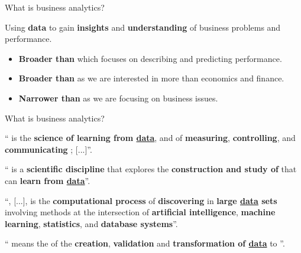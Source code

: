\documentclass[14pt]{beamer}
\begin{document}
\begin{frame}{What is business analytics?}

\begin{block}{}
Using \textbf{data} to gain \textbf{insights} and \textbf{understanding} of business problems and performance.
\end{block}\pause
\begin{itemize}
\item \textbf{Broader than } which focuses on describing and predicting performance.
\item \textbf{Broader than } as we are interested in more than economics and  finance.
\item \textbf{Narrower than } as we are focusing on {business issues}.
\end{itemize}
\end{frame}

\begin{frame}{What is business analytics?}\fontsize{12}{12}\sf
\begin{block}{}
`` is the \textbf{science of learning from \underline{data}}, and of \textbf{measuring}, \textbf{controlling}, and \textbf{communicating }; [...]''.
\end{block}\pause

\begin{block}{}
`` is a \textbf{scientific discipline} that explores the \textbf{construction and study of } that can \textbf{learn from \underline{data}}''.
\end{block}\pause

\begin{block}{}
``, [...], is the \textbf{computational process} of \textbf{discovering } in \textbf{large \underline{data} sets} involving methods at the intersection of \textbf{artificial intelligence}, \textbf{machine learning}, \textbf{statistics}, and \textbf{database systems}''.
\end{block}\pause

\begin{block}{}
`` means the \textbf{} of the \textbf{creation}, \textbf{validation} and \textbf{transformation of \underline{data}} to \textbf{}''.
\end{block}\pause

\end{frame}
\end{document}
